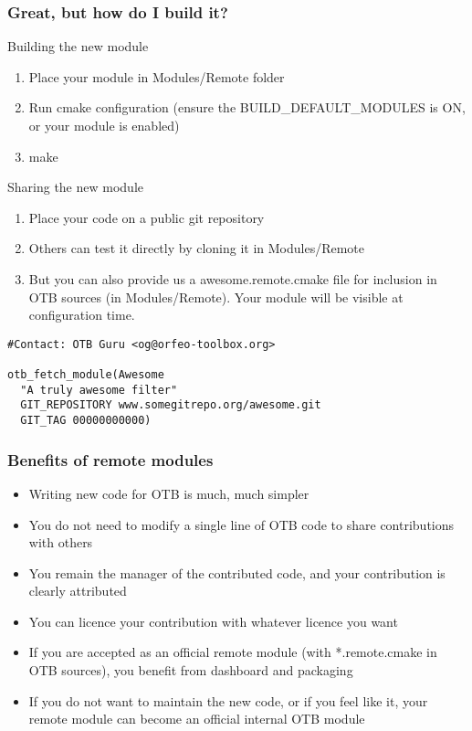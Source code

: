 \documentclass[8pt]{beamer}
\begin{document}
\begin{frame}[fragile]
\frametitle{Great, but how do I build it?}
\begin{block}{Building the new module}
\begin{enumerate}
\item Place your module in Modules/Remote folder
\item Run cmake configuration (ensure the BUILD\_DEFAULT\_MODULES is ON, or your module is enabled)
\item make
\end{enumerate}
\end{block}

\begin{block}{Sharing the new module}
\begin{enumerate}
\item Place your code on a public git repository
\item Others can test it directly by cloning it in Modules/Remote
\item But you can also provide us a awesome.remote.cmake file for inclusion in OTB sources (in Modules/Remote). Your module will be visible at configuration time.
\end{enumerate}
\begin{center}
\begin{small}
\begin{verbatim}
#Contact: OTB Guru <og@orfeo-toolbox.org>

otb_fetch_module(Awesome
  "A truly awesome filter"
  GIT_REPOSITORY www.somegitrepo.org/awesome.git
  GIT_TAG 00000000000)
\end{verbatim}
\end{small}
\end{center}
\end{block}

\end{frame}

\begin{frame}
\frametitle{Benefits of remote modules}
\begin{itemize}
\item Writing new code for OTB is much, much simpler
\item You do not need to modify a single line of OTB code to share contributions with others
\item You remain the manager of the contributed code, and your contribution is clearly attributed
\item You can licence your contribution with whatever licence you want
\item If you are accepted as an official remote module (with *.remote.cmake in OTB sources), you benefit from dashboard and packaging
\item If you do not want to maintain the new code, or if you feel like it, your remote module can become an official internal OTB module
\end{itemize}
\end{frame}
\end{document}
